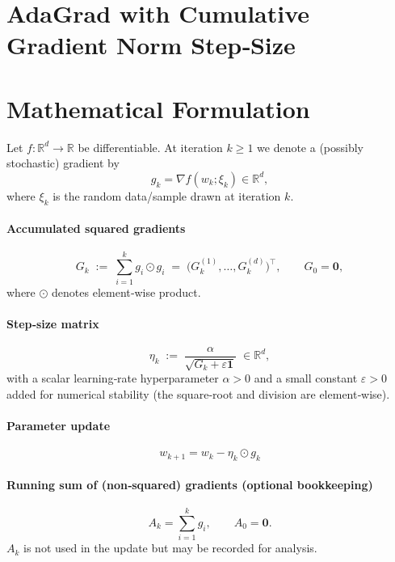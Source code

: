 \documentclass{article}
\newcommand{\R}{\mathbb{R}}
\begin{document}
\section*{AdaGrad with Cumulative Gradient Norm Step‑Size}

\section*{Mathematical Formulation}
Let $f:\R^{d}\to\R$ be differentiable.  
At iteration $k\ge 1$ we denote a (possibly stochastic) gradient by 
\[
g_k = \nabla f(w_k;\xi_k)\in\R^{d},
\]
where $\xi_k$ is the random data/sample drawn at iteration $k$.

\paragraph{Accumulated squared gradients}
\[
G_k \;:=\; \sum_{i=1}^{k} g_i\odot g_i \;=\; \bigl(G_k^{(1)},\dots,G_k^{(d)}\bigr)^{\top},
\qquad 
G_0 = \mathbf{0},
\]
where $\odot$ denotes element‑wise product.

\paragraph{Step‑size matrix}
\[
\eta_k \;:=\; \frac{\alpha}{\sqrt{G_k+\varepsilon\mathbf{1}}}\;\in\R^{d},
\]
with a scalar learning‑rate hyperparameter $\alpha>0$ and a small constant $\varepsilon>0$ added for numerical stability (the square‑root and division are element‑wise).

\paragraph{Parameter update}
\[
\boxed{w_{k+1}= w_k - \eta_k\odot g_k } \tag{1}
\]

\paragraph{Running sum of (non‑squared) gradients (optional bookkeeping)}
\[
A_k = \sum_{i=1}^{k} g_i ,\qquad A_0=\mathbf 0 .
\]
$A_k$ is not used in the update but may be recorded for analysis.
\end{document}
